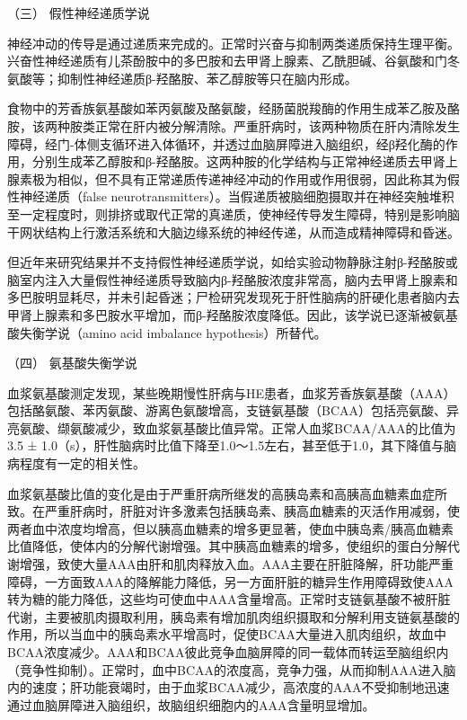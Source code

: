 \hypertarget{text00101.htmlux5cux23CHP4-3-4-2-3}{}
（三） 假性神经递质学说

神经冲动的传导是通过递质来完成的。正常时兴奋与抑制两类递质保持生理平衡。兴奋性神经递质有儿茶酚胺中的多巴胺和去甲肾上腺素、乙酰胆碱、谷氨酸和门冬氨酸等；抑制性神经递质β-羟酪胺、苯乙醇胺等只在脑内形成。

食物中的芳香族氨基酸如苯丙氨酸及酪氨酸，经肠菌脱羧酶的作用生成苯乙胺及酪胺，该两种胺类正常在肝内被分解清除。严重肝病时，该两种物质在肝内清除发生障碍，经门-体侧支循环进入体循环，并透过血脑屏障进入脑组织，经β羟化酶的作用，分别生成苯乙醇胺和β-羟酪胺。这两种胺的化学结构与正常神经递质去甲肾上腺素极为相似，但不具有正常递质传递神经冲动的作用或作用很弱，因此称其为假性神经递质（false
neurotransmitters）。当假递质被脑细胞摄取并在神经突触堆积至一定程度时，则排挤或取代正常的真递质，使神经传导发生障碍，特别是影响脑干网状结构上行激活系统和大脑边缘系统的神经传递，从而造成精神障碍和昏迷。

但近年来研究结果并不支持假性神经递质学说，如给实验动物静脉注射β-羟酪胺或脑室内注入大量假性神经递质导致脑内β-羟酪胺浓度非常高，脑内去甲肾上腺素和多巴胺明显耗尽，并未引起昏迷；尸检研究发现死于肝性脑病的肝硬化患者脑内去甲肾上腺素和多巴胺水平增加，而β-羟酪胺浓度降低。因此，该学说已逐渐被氨基酸失衡学说（amino
acid imbalance hypothesis）所替代。

\hypertarget{text00101.htmlux5cux23CHP4-3-4-2-4}{}
（四） 氨基酸失衡学说

血浆氨基酸测定发现，某些晚期慢性肝病与HE患者，血浆芳香族氨基酸（AAA）包括酪氨酸、苯丙氨酸、游离色氨酸增高，支链氨基酸（BCAA）包括亮氨酸、异亮氨酸、缬氨酸减少，致血浆氨基酸比值异常。正常人血浆BCAA/AAA的比值为3.5
±
1.0（s），肝性脑病时比值下降至1.0～1.5左右，甚至低于1.0，其下降值与脑病程度有一定的相关性。

血浆氨基酸比值的变化是由于严重肝病所继发的高胰岛素和高胰高血糖素血症所致。在严重肝病时，肝脏对许多激素包括胰岛素、胰高血糖素的灭活作用减弱，使两者血中浓度均增高，但以胰高血糖素的增多更显著，使血中胰岛素/胰高血糖素比值降低，使体内的分解代谢增强。其中胰高血糖素的增多，使组织的蛋白分解代谢增强，致使大量AAA由肝和肌肉释放入血。AAA主要在肝脏降解，肝功能严重障碍，一方面致AAA的降解能力降低，另一方面肝脏的糖异生作用障碍致使AAA转为糖的能力降低，这些均可使血中AAA含量增高。正常时支链氨基酸不被肝脏代谢，主要被肌肉摄取利用，胰岛素有增加肌肉组织摄取和分解利用支链氨基酸的作用，所以当血中的胰岛素水平增高时，促使BCAA大量进入肌肉组织，故血中BCAA浓度减少。AAA和BCAA彼此竞争血脑屏障的同一载体而转运至脑组织内（竞争性抑制）。正常时，血中BCAA的浓度高，竞争力强，从而抑制AAA进入脑内的速度；肝功能衰竭时，由于血浆BCAA减少，高浓度的AAA不受抑制地迅速通过血脑屏障进入脑组织，故脑组织细胞内的AAA含量明显增加。

